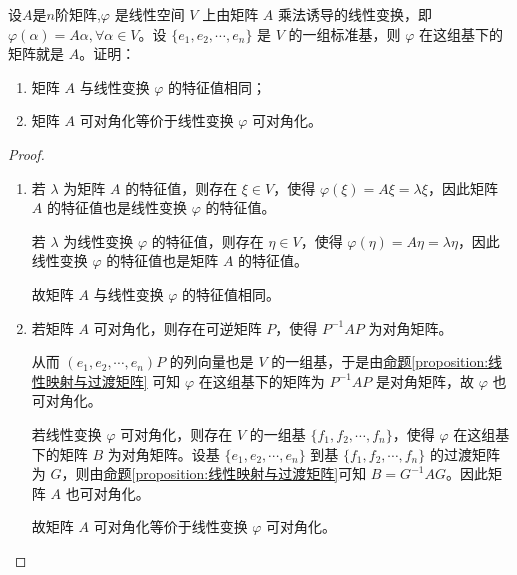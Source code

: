 \documentclass[../../main.tex]{subfiles}
\begin{document}
\begin{lemma}\label{lemma:线性变换与矩阵的可对角化等价,特征值相同}
设$A$是$n$阶矩阵,$\varphi$ 是线性空间 $V$ 上由矩阵 $A$ 乘法诱导的线性变换，即 $\varphi(\alpha) = A\alpha, \forall \alpha \in V$。设 $\{e_1, e_2, \cdots, e_n\}$ 是 $V$ 的一组标准基，则 $\varphi$ 在这组基下的矩阵就是 $A$。证明：
\begin{enumerate}[(1)]
\item 矩阵 $A$ 与线性变换 $\varphi$ 的特征值相同；

\item 矩阵 $A$ 可对角化等价于线性变换 $\varphi$ 可对角化。
\end{enumerate}
\end{lemma}
\begin{proof}
\begin{enumerate}[(1)]
\item 若 $\lambda$ 为矩阵 $A$ 的特征值，则存在 $\xi \in V$，使得 $\varphi(\xi) = A\xi = \lambda \xi$，因此矩阵 $A$ 的特征值也是线性变换 $\varphi$ 的特征值。

若 $\lambda$ 为线性变换 $\varphi$ 的特征值，则存在 $\eta \in V$，使得 $\varphi(\eta) = A\eta = \lambda \eta$，因此线性变换 $\varphi$ 的特征值也是矩阵 $A$ 的特征值。

故矩阵 $A$ 与线性变换 $\varphi$ 的特征值相同。

\item 若矩阵 $A$ 可对角化，则存在可逆矩阵 $P$，使得 $P^{-1}AP$ 为对角矩阵。

从而 $(e_1, e_2, \cdots, e_n)P$ 的列向量也是 $V$ 的一组基，于是由\hyperref[proposition:线性映射与过渡矩阵]{命题\ref{proposition:线性映射与过渡矩阵}} 可知 $\varphi$ 在这组基下的矩阵为 $P^{-1}AP$ 是对角矩阵，故 $\varphi$ 也可对角化。

若线性变换 $\varphi$ 可对角化，则存在 $V$ 的一组基 $\{f_1, f_2, \cdots, f_n\}$，使得 $\varphi$ 在这组基下的矩阵 $B$ 为对角矩阵。设基 $\{e_1, e_2, \cdots, e_n\}$ 到基 $\{f_1, f_2, \cdots, f_n\}$ 的过渡矩阵为 $G$，则由\hyperref[proposition:线性映射与过渡矩阵]{命题\ref{proposition:线性映射与过渡矩阵}}可知 $B = G^{-1}AG$。因此矩阵 $A$ 也可对角化。

故矩阵 $A$ 可对角化等价于线性变换 $\varphi$ 可对角化。
\end{enumerate}
\end{proof}
\end{document}
